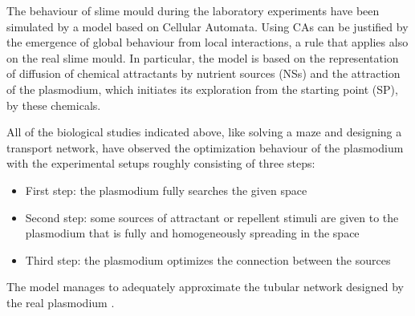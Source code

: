 The behaviour of slime mould during the laboratory experiments have been simulated by a model based on Cellular Automata. Using CAs can be justified by the emergence of global behaviour from local interactions, a rule that applies also on the real slime mould.
In particular, the model is based on the representation of diffusion of chemical attractants by nutrient sources (NSs) and the attraction of the plasmodium, which initiates its exploration from the starting point (SP), by these chemicals. 
\par
All of the biological studies indicated above, like solving a maze and designing a transport network, have observed the optimization behaviour of the plasmodium with the experimental setups roughly consisting of three steps:
\begin{itemize}
\item First step: the plasmodium fully searches the given space
\item Second step: some sources of attractant or repellent stimuli are given to the plasmodium that is fully and homogeneously spreading in the space
\item Third step: the plasmodium optimizes the connection between the sources
\end{itemize}

The model manages to adequately approximate the tubular network designed by the real plasmodium \cite{shirakawa2015construction}.

